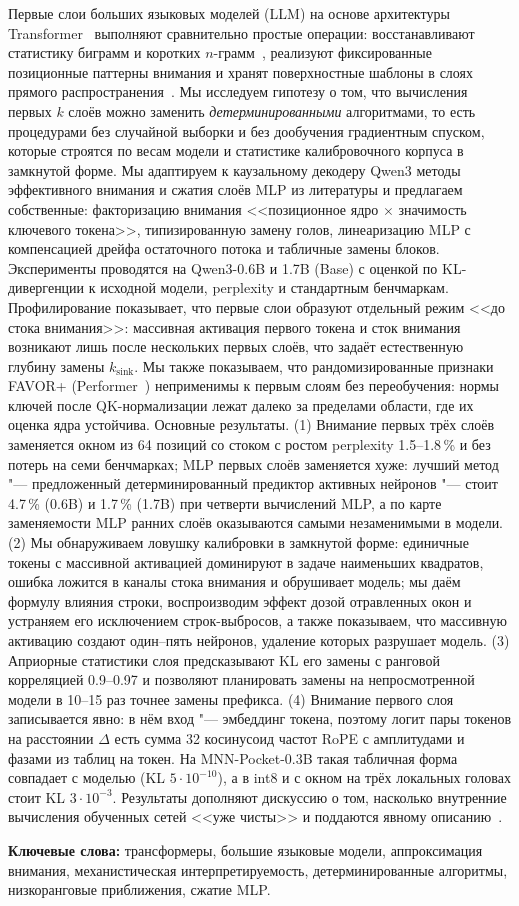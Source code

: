 Первые слои больших языковых моделей (LLM) на основе архитектуры
Transformer~\cite{vaswani2017attention} выполняют сравнительно простые
операции: восстанавливают статистику биграмм и коротких
$n$-грамм~\cite{elhage2021framework}, реализуют фиксированные позиционные
паттерны внимания и хранят поверхностные шаблоны в слоях
прямого распространения~\cite{geva2021ffn}.
Мы исследуем гипотезу о том, что вычисления первых $k$ слоёв можно
заменить \emph{детерминированными} алгоритмами, то есть процедурами без
случайной выборки и без дообучения градиентным спуском, которые
строятся по весам модели и статистике калибровочного корпуса в
замкнутой форме. Мы адаптируем к каузальному декодеру Qwen3 методы
эффективного внимания и сжатия слоёв MLP из литературы и предлагаем
собственные: факторизацию внимания <<позиционное ядро $\times$
значимость ключевого токена>>, типизированную замену голов,
линеаризацию MLP с компенсацией дрейфа остаточного потока и табличные
замены блоков. Эксперименты проводятся на Qwen3-0.6B и 1.7B
(Base) с оценкой по KL-дивергенции к исходной модели, perplexity и
стандартным бенчмаркам.
Профилирование показывает, что первые слои образуют отдельный режим
<<до стока внимания>>: массивная активация первого токена и сток
внимания возникают лишь после нескольких первых слоёв, что задаёт
естественную глубину замены $k_{\mathrm{sink}}$. Мы также показываем,
что рандомизированные признаки FAVOR+ (Performer~\cite{choromanski2021performer})
неприменимы к первым слоям без переобучения: нормы ключей после
QK-нормализации лежат далеко за пределами области, где их оценка
ядра устойчива.
Основные результаты. (1) Внимание первых трёх слоёв заменяется окном
из 64 позиций со стоком с ростом perplexity 1.5--1.8\,\% и без потерь на
семи бенчмарках; MLP первых слоёв заменяется хуже: лучший метод "---
предложенный детерминированный предиктор активных нейронов "--- стоит
4.7\,\% (0.6B) и 1.7\,\% (1.7B) при четверти вычислений MLP, а по карте
заменяемости MLP ранних слоёв оказываются самыми незаменимыми в модели.
(2) Мы обнаруживаем ловушку калибровки в замкнутой форме: единичные
токены с массивной активацией доминируют в задаче наименьших квадратов,
ошибка ложится в каналы стока внимания и обрушивает модель; мы даём
формулу влияния строки, воспроизводим эффект дозой отравленных окон и
устраняем его исключением строк-выбросов, а также показываем, что
массивную активацию создают один--пять нейронов, удаление которых
разрушает модель. (3) Априорные статистики слоя предсказывают KL его
замены с ранговой корреляцией 0.9--0.97 и позволяют планировать замены
на непросмотренной модели в 10--15 раз точнее замены префикса.
(4) Внимание первого слоя записывается явно: в нём вход "--- эмбеддинг
токена, поэтому логит пары токенов на расстоянии $\Delta$ есть сумма 32
косинусоид частот RoPE с амплитудами и фазами из таблиц на токен. На
MNN-Pocket-0.3B такая табличная форма совпадает с моделью (KL $5\cdot10^{-10}$),
а в int8 и с окном на трёх локальных головах стоит KL $3\cdot10^{-3}$.
Результаты дополняют дискуссию о том, насколько внутренние вычисления
обученных сетей <<уже чисты>> и поддаются явному
описанию~\cite{cammarata_clean,gao_notclean}.

\medskip
\noindent\textbf{Ключевые слова:} трансформеры, большие языковые модели,
аппроксимация внимания, механистическая интерпретируемость,
детерминированные алгоритмы, низкоранговые приближения, сжатие MLP.
